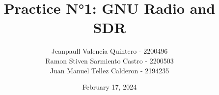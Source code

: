 \documentclass{journal}[IEEEtran, twocolumn]             %
\newcommand{\dochead}{Practice N°1}
\newcommand{\docsubhead}{GNU Radio and SDR}
\newcommand{\titulo}{\dochead: \docsubhead}
\newcommand{\fecha}{February 17, 2024}
\begin{document}

\title{\textbf{\titulo}}            %

\author{
Jeanpaull Valencia Quintero - 2200496 \\
Ramon Stiven Sarmiento Castro - 2200503 \\
Juan Manuel Tellez Calderon - 2194235
}


\date{\fecha}                       %

\maketitle                          %
\thispagestyle{fancy}               %


\color{black}
\end{document}
